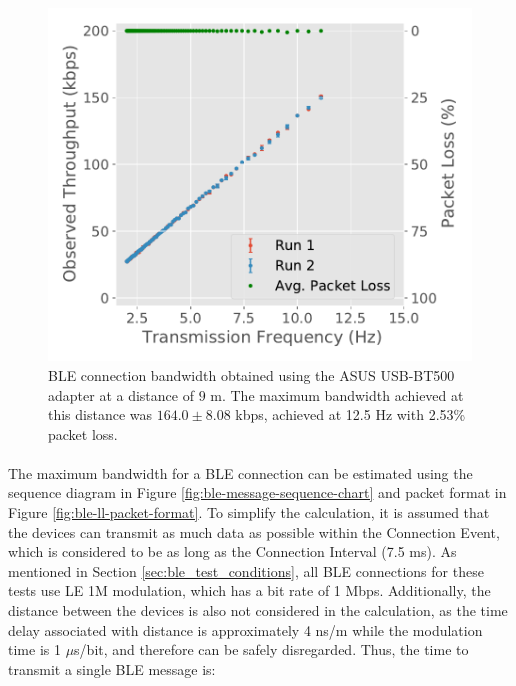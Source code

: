 \begin{figure}[H]
\begin{minipage}{0.45\linewidth}
        \includegraphics[width=\linewidth]{images/ble-bandwidth-hci0-900cm.pdf}
        \caption[\acs{BLE} connection bandwidth obtained using the ASUS USB-BT500 adapter at a distance of 9 m.]{\acs{BLE} connection bandwidth obtained using the ASUS USB-BT500 adapter at a distance of $9\text{ m}$. The maximum bandwidth achieved at this distance was $164.0 \pm 8.08$ kbps, achieved at 12.5 Hz with 2.53\% packet loss.}
        \label{fig:ble-bandwidth-hci0-9m}
    \end{minipage}
\end{figure}

\paragraph{} The maximum bandwidth for a \acs{BLE} connection can be estimated using the sequence diagram in Figure \ref{fig:ble-message-sequence-chart} and packet format in Figure \ref{fig:ble-ll-packet-format}. To simplify the calculation, it is assumed that the devices can transmit as much data as possible within the Connection Event, which is considered to be as long as the Connection Interval (7.5 ms). As mentioned in Section \ref{sec:ble_test_conditions}, all \acs{BLE} connections for these tests use LE 1M modulation, which has a bit rate of 1 Mbps. Additionally, the distance between the devices is also not considered in the calculation, as the time delay associated with distance is approximately 4 ns/m \cite{Specification1999} while the modulation time is 1 $\mu$s/bit, and therefore can be safely disregarded. Thus, the time to transmit a single \acs{BLE} message is:

